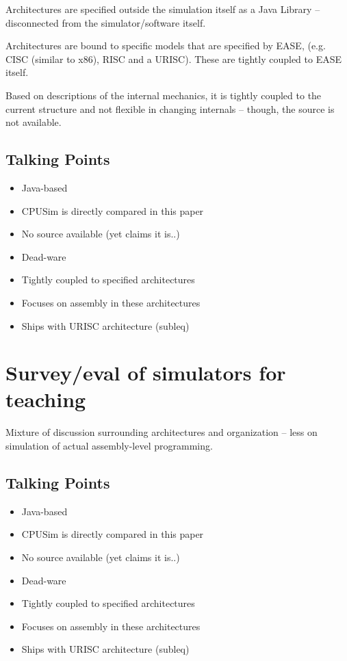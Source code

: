 Architectures are specified outside the simulation itself as a Java Library -- disconnected from the simulator/software itself. 

Architectures are bound to specific models that are specified by EASE, (e.g. CISC (similar to x86), RISC and a URISC). These are tightly coupled to EASE itself. 

Based on descriptions of the internal mechanics, it is tightly coupled to the current structure and not flexible in changing internals -- though, the source is not available. 


\subsection{Talking Points}

\begin{itemize}
\item Java-based
\item CPUSim is directly compared in this paper
\item No source available (yet claims it is..)
\item Dead-ware
\item Tightly coupled to specified architectures
\item Focuses on assembly in these architectures
\item Ships with URISC architecture (subleq)
\end{itemize}

\section{Survey/eval of simulators for teaching}

\cite{Nikolic2009}

Mixture of discussion surrounding architectures and organization -- less on simulation of actual assembly-level programming.  


\subsection{Talking Points}

\begin{itemize}
\item Java-based
\item CPUSim is directly compared in this paper
\item No source available (yet claims it is..)
\item Dead-ware
\item Tightly coupled to specified architectures
\item Focuses on assembly in these architectures
\item Ships with URISC architecture (subleq)
\end{itemize}

